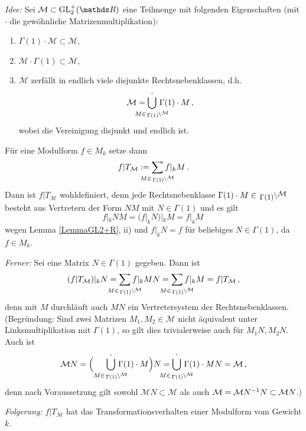 \emph{Idee:} Sei $\mathcal{M} \subset \GL_2^+(\RR)$ eine Teilmenge mit folgenden Eigenschaften (mit $\cdot$ die gewöhnliche Matrizenmultiplikation): \begin{enumerate}
\item $\Gamma (1) \cdot \mathcal M \subset \mathcal M$,
\item $\mathcal M \cdot \Gamma(1) \subset \mathcal M$,
\item $\mathcal M$ zerfällt in endlich viele disjunkte Rechtsnebenklassen, d.h.
\[
\mathcal M = \smashoperator{\bigcup_{M \in \linksmodulo{\Gamma(1)}{\mathcal M}}^{\boldsymbol{\cdot}}} \, \Gamma(1) \cdot M
\,,
\]
wobei die Vereinigung disjunkt und endlich ist. 
\end{enumerate}
Für eine Modulform $f \in M_k$ setze dann
\[
f | T_{\mathcal M} := \smashoperator{\sum_{M \in \linksmodulo{\Gamma(1)}{\mathcal M}}} f|_k M
\,.
\]
Dann ist $f | T_{\mathcal M}$ wohldefiniert, denn jede Rechtsnebenklasse $\Gamma (1) \cdot M \in \linksmodulo{\Gamma(1)}{\mathcal M}$ besteht aus Vertretern der Form $N M$ mit $N \in \Gamma (1)$ und es gilt
\[
f |_k N M = (f |_k N) |_k M = f |_k M
\,
\]
wegen Lemma \ref{LemmaGL2+R}, ii) und $f |_k N = f$ für beliebiges $N \in \Gamma (1)$, da $f \in M_k$.

\emph{Ferner:} Sei eine Matrix $N \in \Gamma(1)$ gegeben. Dann ist 
\[
(f | T_{\mathcal M}) |_k N = \smashoperator{\sum_{M \in \linksmodulo{\Gamma(1)}{\mathcal M}}} f |_k M N = \smashoperator{\sum_{M \in \linksmodulo{\Gamma(1)}{\mathcal M}}} f |_k M = f | T_{\mathcal M}
\,,
\]
denn mit $M$ durchläuft auch $MN$ ein Vertretersystem der Rechtsnebenklassen. (Begründung: Sind zwei Matrizen $M_1, M_2 \in \mathcal M$ nicht äquivalent unter Linksmultiplikation mit $\Gamma(1)$, so gilt dies trivialerweise auch für $M_1N, M_2N$. Auch ist
\[
\mathcal M N = \Bigl( \smashoperator[r]{\bigcup_{M \in \linksmodulo{\Gamma(1)}{\mathcal M}}^{\boldsymbol{\cdot}}} \, \Gamma(1) \cdot M \Bigr) N = \smashoperator{\bigcup_{M \in \linksmodulo{\Gamma(1)}{\mathcal M}}^{\boldsymbol{\cdot}}} \, \Gamma(1) \cdot M N = \mathcal M
\,,
\]
denn nach Voraussetzung gilt sowohl $\mathcal M N \subset \mathcal M$ als auch $\mathcal M = \mathcal M N^{-1}N \subset \mathcal M N$.)

\emph{Folgerung:} $f | T_{\mathcal M}$ hat das Transformationsverhalten einer Modulform vom Gewicht $k$.
